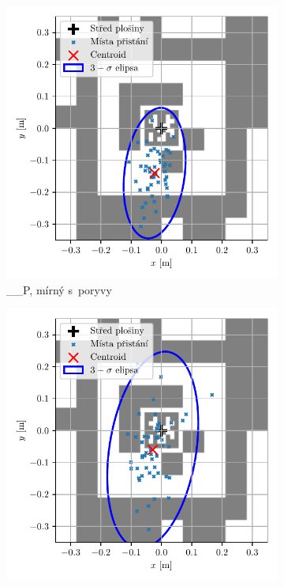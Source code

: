     \begin{figure}[H]
      \centering
      \begin{subfigure}[b]{0.495\textwidth}
        \includegraphics[width=\textwidth]{img/results/__P1_vitr2_pristani.pdf}
        \caption{\_\_P, mírný s~poryvy}
      \end{subfigure}
      \hfill
      \begin{subfigure}[b]{0.495\textwidth}
        \includegraphics[width=\textwidth]{img/results/KAP1_vitr2_pristani.pdf}

\end{subfigure}
\end{figure}
